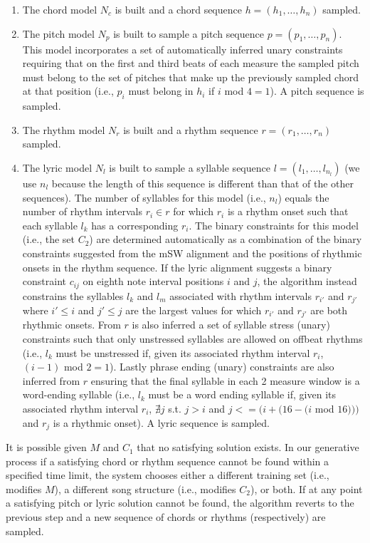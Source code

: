 \documentclass[phd,electronic,oneside,twosidetoc,letterpaper,chaptercenter,parttop,lof,lot]{byumsphd}
\begin{document}
\begin{enumerate}
\item The chord model $N_c$ is built and a chord sequence $h=(h_1,\dots,h_n)$ sampled.
\item The pitch model $N_p$ is built to sample a pitch sequence $p=(p_1,\dots,p_n)$. This model incorporates a set of automatically inferred unary constraints requiring that on the first and third beats of each measure the sampled pitch must belong to the set of pitches that make up the previously sampled chord at that position (i.e., $p_i$ must belong in $h_i$ if $i$ mod $4 = 1$). A pitch sequence is sampled.
\item The rhythm model $N_r$ is built and a rhythm sequence $r=(r_1,\dots,r_n)$ sampled.
\item The lyric model $N_l$ is built to sample a syllable sequence $l=(l_1,\dots,l_{n_l})$ (we use $n_l$ because the length of this sequence is different than that of the other sequences). The number of syllables for this model (i.e., $n_l$) equals the number of rhythm intervals $r_i\in r$ for which $r_i$ is a rhythm onset such that each syllable $l_k$ has a corresponding $r_i$. The binary constraints for this model (i.e., the set $C_2$) are determined automatically as a combination of the binary constraints suggested from the mSW alignment and the positions of rhythmic onsets in the rhythm sequence. If the lyric alignment suggests a binary constraint $c_{ij}$ on eighth note interval positions $i$ and $j$, the algorithm instead constrains the syllables $l_k$ and $l_m$ associated with rhythm intervals $r_{i'}$ and $r_{j'}$ where $i'\le i$ and $j'\le j$ are the largest values for which $r_{i'}$ and $r_{j'}$ are both rhythmic onsets. From $r$ is also inferred a set of syllable stress (unary) constraints such that only unstressed syllables are allowed on offbeat rhythms (i.e., $l_k$ must be unstressed if, given its associated rhythm interval $r_i$, $(i-1)$ mod $2 = 1$). Lastly phrase ending (unary) constraints are also inferred from $r$ ensuring that the final syllable in each 2 measure window is a word-ending syllable (i.e., $l_k$ must be a word ending syllable if, given its associated rhythm interval $r_i$, $\nexists j$ s.t. $j > i$ and $j <= (i + (16-(i$ mod $16)))$ and $r_j$ is a rhythmic onset). A lyric sequence is sampled.
\end{enumerate}

\noindent It is possible given ${M}$ and ${C_1}$ that no satisfying solution exists. In our generative process if a satisfying chord or rhythm sequence cannot be found within a specified time limit, the system chooses either a different training set (i.e., modifies ${M}$), a different song structure (i.e., modifies ${C_2}$), or both. If at any point a satisfying pitch or lyric solution cannot be found, the algorithm reverts to the previous step and a new sequence of chords or rhythms (respectively) are sampled.
\end{document}
